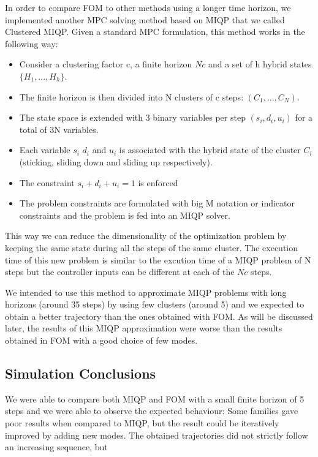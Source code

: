 \documentclass[12,twoside]{TFG-GM}
\theoremstyle{definition}
\theoremstyle{remark}
\begin{document}
In order to compare FOM to other methods using a longer time horizon, we implemented another MPC solving method based on MIQP that we called Clustered MIQP. Given a standard MPC formulation, this method works in the following way:

\begin{itemize}
\item Consider a clustering factor c, a finite horizon $ N c$ and a set of h hybrid states $ \{ H_1, ..., H_h \}$.
\item The finite horizon is then divided into N clusters of c steps: $(C_1, ..., C_N)$.
\item The state space is extended with 3 binary variables per step $(s_i, d_i, u_i)$ for a total of 3N variables.
\item Each variable $s_i$ $d_i$ and $u_i$ is associated with the hybrid state of the cluster $C_i$ (sticking, sliding down and sliding up respectively).
\item The constraint $s_i + d_i + u_i = 1$ is enforced 
\item The problem constraints are formulated with big M notation or indicator constraints and the problem is fed into an MIQP solver.
\end{itemize}

This way we can reduce the dimensionality of the optimization problem by keeping the same state during all the steps of the same cluster. The execution time of this new problem is similar to the excution time of a MIQP problem of N steps but the controller inputs can be different at each of the $N c$ steps.

We intended to use this method to approximate MIQP problems with long horizons (around 35 steps) by using few clusters (around 5) and we expected to obtain a better trajectory than the ones obtained with FOM. As will be discussed later, the results of this MIQP approximation were worse than the results obtained in FOM with a good choice of few modes.

\subsection{Simulation Conclusions}

We were able to compare both MIQP and FOM with a small finite horizon of 5 steps and we were able to observe the expected behaviour: Some families gave poor results when compared to MIQP, but the result could be iteratively improved by adding new modes. The obtained trajectories did not strictly follow an increasing sequence, but 
\end{document}
